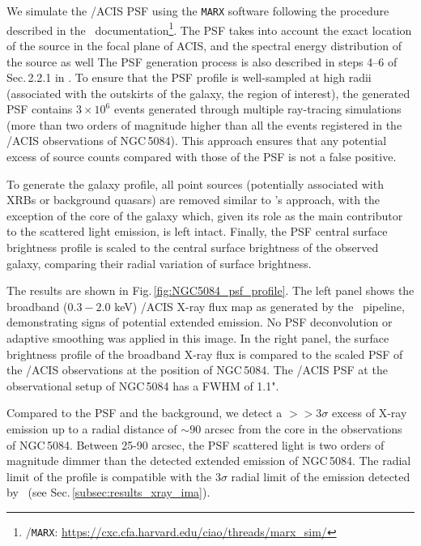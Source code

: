 \documentclass[modern]{CORE-AAS/aastex631}
\begin{document}

We simulate the \Chandra/ACIS PSF using the \texttt{MARX} software following the procedure described in the \ciao\ documentation\footnote{\ciao/\texttt{MARX}: \url{https://cxc.cfa.harvard.edu/ciao/threads/marx_sim/}}. The PSF takes into account the exact location of the source in the focal plane of ACIS, and the spectral energy distribution of the source as well The PSF generation process is also described in steps 4--6 of Sec.\,2.2.1 in \citet{borlaff+2024apj967_169}. To ensure that the PSF profile is well-sampled at high radii (associated with the outskirts of the galaxy, the region of interest), the generated PSF contains $3\times10^6$ events generated through multiple ray-tracing simulations (more than two orders of magnitude higher than all the events registered in the \Chandra/ACIS observations of NGC\,5084). This approach ensures that any potential excess of source counts compared with those of the PSF is not a false positive.

To generate the galaxy profile, all point sources (potentially associated with XRBs or background quasars) are removed similar to \SAUNAS's approach, with the exception of the core of the galaxy which, given its role as the main contributor to the scattered light emission, is left intact. Finally, the PSF central surface brightness profile is scaled to the central surface brightness of the observed galaxy, comparing their radial variation of surface brightness.

The results are shown in Fig.\,\ref{fig:NGC5084_psf_profile}. The left panel shows the broadband ($0.3-2.0$ keV) \Chandra/ACIS X-ray flux map as generated by the \ciao\ pipeline, demonstrating signs of potential extended emission. No PSF deconvolution or adaptive smoothing was applied in this image. In the right panel, the surface brightness profile of the broadband X-ray flux is compared to the scaled PSF of the \Chandra/ACIS observations at the position of NGC\,5084. The \Chandra/ACIS PSF at the observational setup of NGC\,5084 has a FWHM of 1.1".

Compared to the PSF and the background, we detect a $>>3\sigma$ excess of X-ray emission up to a radial distance of $\sim90$ arcsec from the core in the observations of NGC\,5084. Between 25-90 arcsec, the PSF scattered light is two orders of magnitude dimmer than the detected extended emission of NGC\,5084. The radial limit of the profile is compatible with the $3\sigma$ radial limit of the emission detected by \SAUNAS\ (see Sec.\,\ref{subsec:results_xray_ima}).
\end{document}
